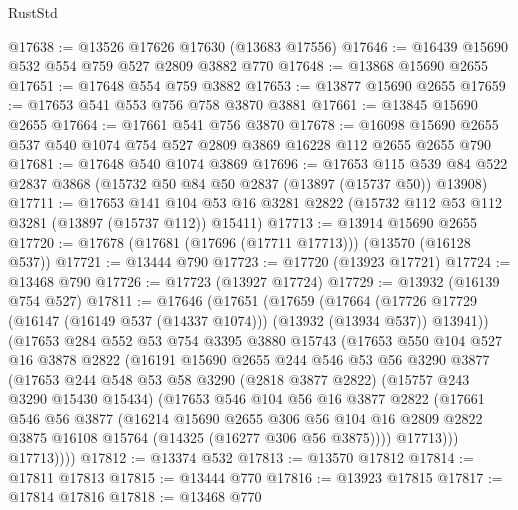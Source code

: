 \begin{lexlean}{RustStd}
\begin{coremodule}
@17638 := @13526 @17626 @17630 (@13683 @17556)
@17646 := @16439 @15690 @532 @554 @759 @527 @2809 @3882 @770
@17648 := @13868 @15690 @2655
@17651 := @17648 @554 @759 @3882
@17653 := @13877 @15690 @2655
@17659 := @17653 @541 @553 @756 @758 @3870 @3881
@17661 := @13845 @15690 @2655
@17664 := @17661 @541 @756 @3870
@17678 := @16098 @15690 @2655 @537 @540 @1074 @754 @527 @2809 @3869 @16228 @112 @2655 @2655 @790
@17681 := @17648 @540 @1074 @3869
@17696 := @17653
    @115
    @539
    @84
    @522
    @2837
    @3868
    (@15732 @50 @84 @50 @2837 (@13897 (@15737 @50)) @13908)
@17711 := @17653
    @141
    @104
    @53
    @16
    @3281
    @2822
    (@15732 @112 @53 @112 @3281 (@13897 (@15737 @112)) @15411)
@17713 := @13914 @15690 @2655
@17720 := @17678 (@17681 (@17696 (@17711 @17713))) (@13570 (@16128 @537))
@17721 := @13444 @790
@17723 := @17720 (@13923 @17721)
@17724 := @13468 @790
@17726 := @17723 (@13927 @17724)
@17729 := @13932 (@16139 @754 @527)
@17811 := @17646
    (@17651
      (@17659
        (@17664 (@17726 @17729 (@16147 (@16149 @537 (@14337 @1074))) (@13932 (@13934 @537)) @13941))
        (@17653
          @284
          @552
          @53
          @754
          @3395
          @3880
          @15743
          (@17653
            @550
            @104
            @527
            @16
            @3878
            @2822
            (@16191
              @15690
              @2655
              @244
              @546
              @53
              @56
              @3290
              @3877
              (@17653
                @244
                @548
                @53
                @58
                @3290
                (@2818 @3877 @2822)
                (@15757 @243 @3290 @15430 @15434)
                (@17653
                  @546
                  @104
                  @56
                  @16
                  @3877
                  @2822
                  (@17661
                    @546
                    @56
                    @3877
                    (@16214
                      @15690
                      @2655
                      @306
                      @56
                      @104
                      @16
                      @2809
                      @2822
                      @3875
                      @16108
                      @15764
                      (@14325 (@16277 @306 @56 @3875))))
                  @17713)))
            @17713))))
@17812 := @13374 @532
@17813 := @13570 @17812
@17814 := @17811 @17813
@17815 := @13444 @770
@17816 := @13923 @17815
@17817 := @17814 @17816
@17818 := @13468 @770

\end{coremodule}
\end{lexlean}
